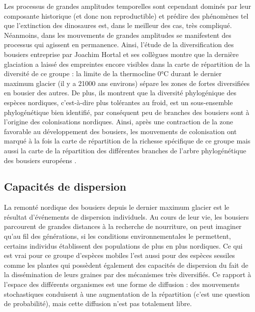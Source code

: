 Les processus de grandes amplitudes temporelles sont cependant dominés
par leur composante historique (et donc non reproductible) et prédire
des phénomènes tel que l'extinction des dinosaures est, dans le meilleur
des cas, très compliqué. Néanmoins, dans les mouvements de grandes
amplitudes se manifestent des processus qui agissent en permanence.
Ainsi, l'étude de la diversification des bousiers entreprise par Joachim
Hortal et ses collègues \citep{Hortal2011} montre que la dernière
glaciation a laissé des empreintes encore visibles dans la carte de
répartition de la diversité de ce groupe : la limite de la thermocline
0°C durant le dernier maximum glacier (il y a 21000 ans environs) sépare
les zones de fortes diversifiées en bousier des autres. De plus, ils
montrent que la diversité phylogénique des espèces nordiques,
c'est-à-dire plus tolérantes au froid, est un sous-ensemble
phylogénétique bien identifié, par conséquent peu de branches des
bousiers sont à l'origine des colonisations nordiques. Ainsi, après une
contraction de la zone favorable au développement des bousiers, les
mouvements de colonisation ont marqué à la fois la carte de répartition
de la richesse spécifique de ce groupe mais aussi la carte de la
répartition des différentes branches de l'arbre phylogénétique des
bousiers européens \citep{Hortal2011}.

\subsection*{Capacités de dispersion}\label{capacituxe9s-de-dispersion}

La remonté nordique des bousiers depuis le dernier maximum glacier est
le résultat d'événements de dispersion individuels. Au cours de leur
vie, les bousiers parcourent de grandes distances à la recherche de
nourriture, on peut imaginer qu'au fil des générations, si les
conditions environnementales le permettent, certains individus
établissent des populations de plus en plus nordiques. Ce qui est vrai
pour ce groupe d'espèces mobiles l'est aussi pour des espèces sessiles
comme les plantes qui possèdent également des capacités de dispersion du
fait de la dissémination de leurs graines par des mécanismes très
diversifiés. Ce rapport à l'espace des différents organismes est une
forme de diffusion : des mouvements stochastiques conduisent à une
augmentation de la répartition (c'est une question de probabilité), mais
cette diffusion n'est pas totalement libre.

